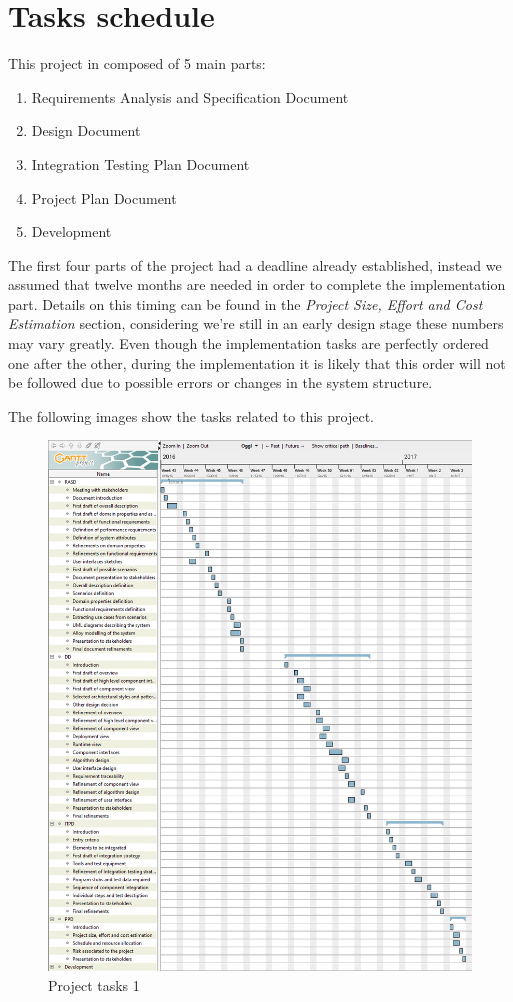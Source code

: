 \section{Tasks schedule}

This project in composed of 5 main parts:

\begin{enumerate}
	\item Requirements Analysis and Specification Document
	\item Design Document
	\item Integration Testing Plan Document
	\item Project Plan Document
	\item Development
\end{enumerate}

The first four parts of the project had a deadline already established, instead
we assumed that twelve months are needed in order to complete the implementation
part. Details on this timing can be found in the \textit{Project Size, Effort
and Cost Estimation} section, considering we're still in an early design stage
these numbers may vary greatly. Even though the implementation tasks are
perfectly ordered one after the other, during the implementation it is likely
that this order will not be followed due to possible errors or changes in the
system structure.

The following images show the tasks related to this project.

\begin{figure}[H]
	\centerline{
		\includegraphics[width=500px]{../Datas/images/tasks-schedule-1.png}
	}
	\caption{Project tasks 1}
		\label{fig:tasks-1}
\end{figure}

